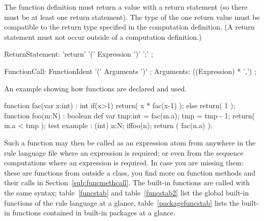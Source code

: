 The function definition must return a value with a return statement (so there must be at least one return statement).
The type of the one return value must be compatible to the return type specified in the computation definition.
(A return statement must not occur outside of a computation definition.)

\begin{rail}
  ReturnStatement: 'return' '(' Expression ')' ';' ;
\end{rail}

\begin{rail}
  FunctionCall: FunctionIdent '(' Arguments ')' ;
  Arguments: ((Expression) * ',') ;
\end{rail}

\begin{example}
An example showing how functions are declared and used.
  \begin{grgen}
function fac(var x:int) : int
{
	if(x>1) {
		return( x * fac(x-1) );
	} else {
		return( 1 );
	}
}
function foo(m:N) : boolean
{
	def var tmp:int = fac(m.a);
	tmp = tmp - 1;
	return( m.a < tmp );
}
test example : (int)
{
	n:N;
	if{foo(n);}
	return ( fac(n.a) );
}
  \end{grgen}
\end{example}

Such a function may then be called as an expression atom from anywhere in the rule language file where an expression is required; or even from the sequence computations where an expression is required.
In case you are missing them: these are functions from outside a class, you find more on function methods and their calls in Section~\ref{sub:funcmethcall}.
The built-in functions are called with the same syntax;
table~\ref{funcstab} and table~\ref{funcstab2} list the global built-in functions of the rule language at a glance,
table~\ref{packagefuncstab} lists the built-in functions contained in built-in packages at a glance.

